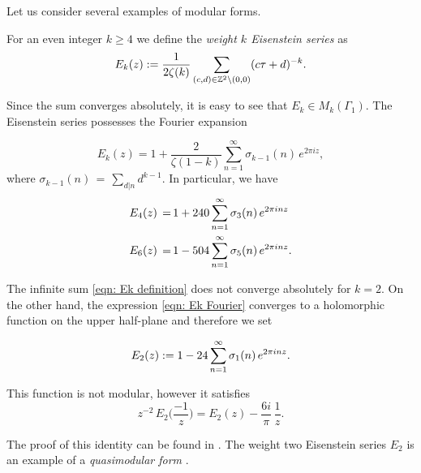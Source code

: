 Let us consider several examples of modular forms.
\begin{definition}\label{def: Ek definition}
For an even integer $k\geq 4$ we define the \emph{weight $k$ Eisenstein series} as
\begin{equation}\label{eqn: Ek definition}E_k(z):=\frac{1}{2\zeta(k)}\sum_{(c,d)\in\mathbb{Z}^2\backslash(0,0)}(c\tau+d)^{-k}.\end{equation}
\end{definition}
Since the sum converges absolutely, it is easy to see that $E_k\in M_k(\Gamma_1)$. The
Eisenstein series possesses the Fourier expansion
\begin{lemma}\label{lemma: Ek Fourier}
\begin{equation}\label{eqn: Ek Fourier}E_k(z)=1+\frac{2}{\zeta(1-k)}\sum_{n=1}^\infty \sigma_{k-1}(n)\,e^{2\pi i z}, \end{equation}
where $\sigma_{k-1}(n)\,=\,\sum_{d|n} d^{k-1}$. In particular, we have
\begin{align}
  E_4(z)\,=\,& 1+240\sum_{n=1}^\infty \sigma_3(n)\,e^{2\pi i n z} \notag \\
  E_6(z)\,=\,& 1-504\sum_{n=1}^\infty \sigma_5(n)\,e^{2\pi i n z}. \notag
\end{align}
\end{lemma}
The infinite sum \eqref{eqn: Ek definition} does not converge absolutely for $k=2$. On the other hand, the expression \eqref{eqn: Ek Fourier} converges to a holomorphic function on the upper half-plane and therefore we set
\begin{definition} \label{def: E2 def}
\begin{equation}E_2(z):= 1-24\sum_{n=1}^\infty \sigma_1(n)\,e^{2\pi i n z}.\notag\end{equation}
\end{definition}
\begin{lemma}
\label{lemma: E2 transform}
This function is not modular, however it satisfies
\begin{equation}\label{eqn: E2 transform}z^{-2}\,E_2\Big(\frac{-1}{z}\Big)=E_2(z) -\frac{6i}{\pi}\, \frac{1}{z}.\end{equation}
\end{lemma}
The proof of this identity can be found in \cite[Section~2.3]{1-2-3}.
The weight two Eisenstein series $E_2$ is an example of a \emph{quasimodular form} \cite[Section~5.1]{1-2-3}.

